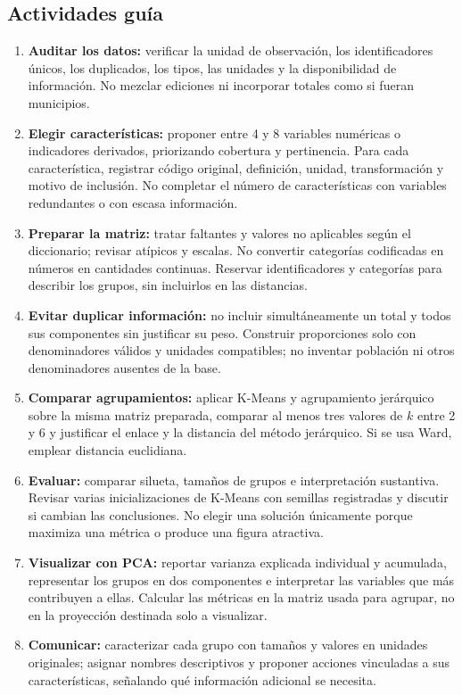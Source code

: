 \documentclass[a4,11pt]{aleph-notas}
\begin{document}
\subsection*{Actividades guía}
\begin{enumerate}[leftmargin=*, label={\arabic*.}]
    \item \textbf{Auditar los datos:} verificar la unidad de observación, los identificadores únicos, los duplicados, los tipos, las unidades y la disponibilidad de información. No mezclar ediciones ni incorporar totales como si fueran municipios.
    \item \textbf{Elegir características:} proponer entre 4 y 8 variables numéricas o indicadores derivados, priorizando cobertura y pertinencia. Para cada característica, registrar código original, definición, unidad, transformación y motivo de inclusión. No completar el número de características con variables redundantes o con escasa información.
    \item \textbf{Preparar la matriz:} tratar faltantes y valores no aplicables según el diccionario; revisar atípicos y escalas. No convertir categorías codificadas en números en cantidades continuas. Reservar identificadores y categorías para describir los grupos, sin incluirlos en las distancias.
    \item \textbf{Evitar duplicar información:} no incluir simultáneamente un total y todos sus componentes sin justificar su peso. Construir proporciones solo con denominadores válidos y unidades compatibles; no inventar población ni otros denominadores ausentes de la base.
    \item \textbf{Comparar agrupamientos:} aplicar K-Means y agrupamiento jerárquico sobre la misma matriz preparada, comparar al menos tres valores de $k$ entre 2 y 6 y justificar el enlace y la distancia del método jerárquico. Si se usa Ward, emplear distancia euclidiana.
    \item \textbf{Evaluar:} comparar silueta, tamaños de grupos e interpretación sustantiva. Revisar varias inicializaciones de K-Means con semillas registradas y discutir si cambian las conclusiones. No elegir una solución únicamente porque maximiza una métrica o produce una figura atractiva.
    \item \textbf{Visualizar con PCA:} reportar varianza explicada individual y acumulada, representar los grupos en dos componentes e interpretar las variables que más contribuyen a ellas. Calcular las métricas en la matriz usada para agrupar, no en la proyección destinada solo a visualizar.
    \item \textbf{Comunicar:} caracterizar cada grupo con tamaños y valores en unidades originales; asignar nombres descriptivos y proponer acciones vinculadas a sus características, señalando qué información adicional se necesita.
\end{enumerate}
\end{document}
